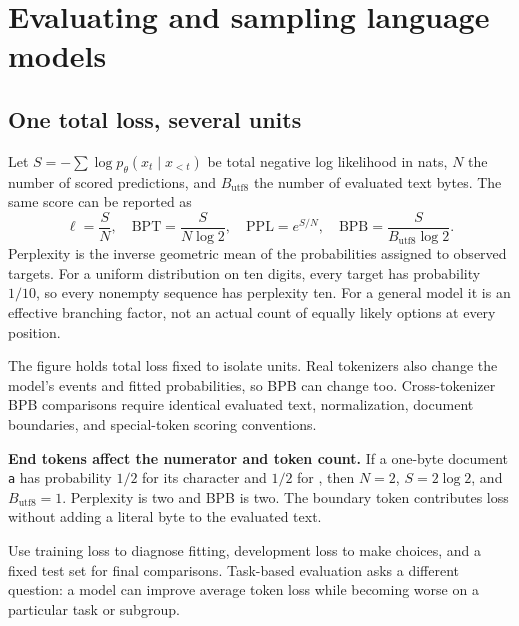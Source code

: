 \clearpage
\section{Evaluating and sampling language models}\label{sec:evaluation}
\subsection*{One total loss, several units}
Let $S=-\sum\log p_\theta(x_t\mid x_{<t})$ be total negative log likelihood
in nats, $N$ the number of scored predictions, and $B_{\mathrm{utf8}}$ the
number of evaluated text bytes. The same score can be reported as
\[
 \ell=\frac SN,\quad \mathrm{BPT}=\frac{S}{N\log2},\quad
 \mathrm{PPL}=e^{S/N},\quad\mathrm{BPB}=\frac{S}{B_{\mathrm{utf8}}\log2}.
\]
Perplexity is the inverse geometric mean of the probabilities assigned to
observed targets. For a uniform distribution on ten digits, every target
has probability $1/10$, so every nonempty sequence has perplexity ten.
For a general model it is an effective branching factor, not an actual
count of equally likely options at every position.



The figure holds total loss fixed to isolate units. Real tokenizers also
change the model's events and fitted probabilities, so BPB can change too.
Cross-tokenizer BPB comparisons require identical evaluated text,
normalization, document boundaries, and special-token scoring conventions.

\textbf{End tokens affect the numerator and token count.} If a one-byte
document \texttt{a} has probability $1/2$ for its character and $1/2$ for
\EOS{}, then $N=2$, $S=2\log2$, and $B_{\mathrm{utf8}}=1$. Perplexity
is two and BPB is two. The boundary token contributes loss without adding
a literal byte to the evaluated text.

Use training loss to diagnose fitting, development loss to make choices,
and a fixed test set for final comparisons. Task-based evaluation asks a
different question: a model can improve average token loss while becoming
worse on a particular task or subgroup.

